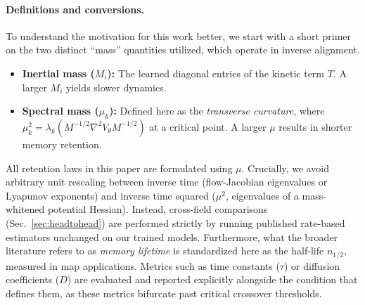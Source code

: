 \documentclass{article}
\begin{document}
\paragraph{Definitions and conversions.} To understand the motivation for this work better, we start with a short primer on the two distinct ``mass'' quantities utilized, which operate in inverse alignment.
\begin{itemize}
    \item \textbf{Inertial mass ($M_i$):} The learned diagonal entries of the kinetic term $T$. A larger $M_i$ yields slower dynamics.
    \item \textbf{Spectral mass ($\mu_k$):} Defined here as the \emph{transverse curvature}, where $\mu_k^2=\lambda_k(M^{-1/2}\nabla^2V_\theta M^{-1/2})$ at a critical point. A larger $\mu$ results in shorter memory retention.
\end{itemize}
All retention laws in this paper are formulated using $\mu$. Crucially, we avoid arbitrary unit rescaling between inverse time (flow-Jacobian eigenvalues or Lyapunov exponents) and inverse time squared ($\mu^2$, eigenvalues of a mass-whitened potential Hessian). Instead, cross-field comparisons (Sec.~\ref{sec:headtohead}) are performed strictly by running published rate-based estimators unchanged on our trained models. Furthermore, what the broader literature refers to as \emph{memory lifetime} is standardized here as the half-life $n_{1/2}$, measured in map applications. Metrics such as time constants ($\tau$) or diffusion coefficients ($D$) are evaluated and reported explicitly alongside the condition that defines them, as these metrics bifurcate past critical crossover thresholds.
\end{document}
